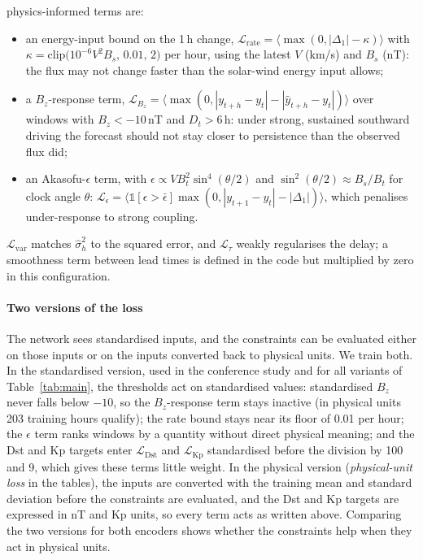 \documentclass[a4paper,fleqn]{cas-dc}
\begin{document}
physics-informed terms are:
\begin{itemize}
\item an energy-input bound on the 1\,h change,
\(\mathcal L_{\mathrm{rate}}=\langle\max(0,|\Delta_1|-\kappa)\rangle\) with
\(\kappa=\mathrm{clip}\big(10^{-6}V^2B_s,\,0.01,\,2\big)\) per hour, using the latest \(V\) (km/s) and \(B_s\)
(nT): the flux may not change faster than the solar-wind energy input allows;
\item a \(B_z\)-response term,
\(\mathcal L_{B_z}=\langle\max(0,|y_{t+h}-y_t|-|\hat y_{t+h}-y_t|)\rangle\) over windows with \(B_z<-10\)\,nT and
\(D_t>6\)\,h: under strong, sustained southward driving the forecast should not stay closer to persistence than the
observed flux did;
\item an Akasofu-\(\epsilon\) term, with \(\epsilon\propto VB_t^2\sin^4(\theta/2)\) and
\(\sin^2(\theta/2)\approx B_s/B_t\) for clock angle \(\theta\):
\(\mathcal L_\epsilon=\langle\mathbb 1[\epsilon>\bar\epsilon]\max(0,|y_{t+1}-y_t|-|\Delta_1|)\rangle\), which
penalises under-response to strong coupling.
\end{itemize}
\(\mathcal L_{\mathrm{var}}\) matches \(\hat\sigma^2_h\) to the squared error, and \(\mathcal L_\tau\) weakly regularises
the delay; a smoothness term between lead times is defined in the code but multiplied by zero in this
configuration.

\paragraph{Two versions of the loss} The network sees standardised inputs, and the constraints can be evaluated
either on those inputs or on the inputs converted back to physical units. We train both. In the standardised
version, used in the conference study and for all variants of Table~\ref{tab:main}, the thresholds act on
standardised values: standardised \(B_z\) never falls below \(-10\), so the \(B_z\)-response term stays inactive
(in physical units 203 training hours qualify); the rate bound stays near its floor of 0.01 per hour; the
\(\epsilon\) term ranks windows by a quantity without direct physical meaning; and the Dst and Kp targets enter
\(\mathcal L_{\mathrm{Dst}}\) and \(\mathcal L_{\mathrm{Kp}}\) standardised before the division by 100 and 9, which gives
these terms little weight. In the physical version (\emph{physical-unit loss} in the tables), the inputs are converted
with the training mean and standard deviation before the constraints are evaluated, and the Dst and Kp targets are
expressed in nT and Kp units, so every term acts as written above. Comparing the two versions for both encoders
shows whether the constraints help when they act in physical units.
\end{document}
